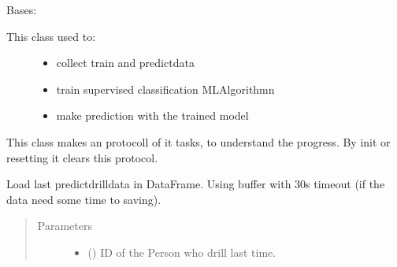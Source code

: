 \documentclass[letterpaper,10pt,english]{sphinxmanual}
\begin{document}
\begin{fulllineitems}
\label{\detokenize{anoog.automation:anoog.automation.ai_model.AI_Model}}
\sphinxAtStartPar
Bases: 
\begin{description}
\item[{This class used to:}] \leavevmode\begin{itemize}
\item {} 
\sphinxAtStartPar
collect train\sphinxhyphen{} and predict\sphinxhyphen{}data

\item {} 
\sphinxAtStartPar
train supervised classification ML\sphinxhyphen{}Algorithmn

\item {} 
\sphinxAtStartPar
make prediction with the trained model

\end{itemize}

\end{description}

\sphinxAtStartPar
This class makes an protocoll of it tasks, to understand the progress.
By init or resetting it clears this protocol.

\begin{fulllineitems}
\label{\detokenize{anoog.automation:anoog.automation.ai_model.AI_Model.add_predict_dataset}}
\sphinxAtStartPar
Load last predict\sphinxhyphen{}drill\sphinxhyphen{}data in DataFrame. Using buffer with 30s timeout (if the data need some time to saving).
\begin{quote}\begin{description}
\item[{Parameters}] \leavevmode\begin{itemize}
\item {} 
\sphinxAtStartPar
{} () \textendash{} ID of the Person who drill last time.


\end{itemize}
\end{description}
\end{quote}
\end{fulllineitems}
\end{fulllineitems}
\end{document}
